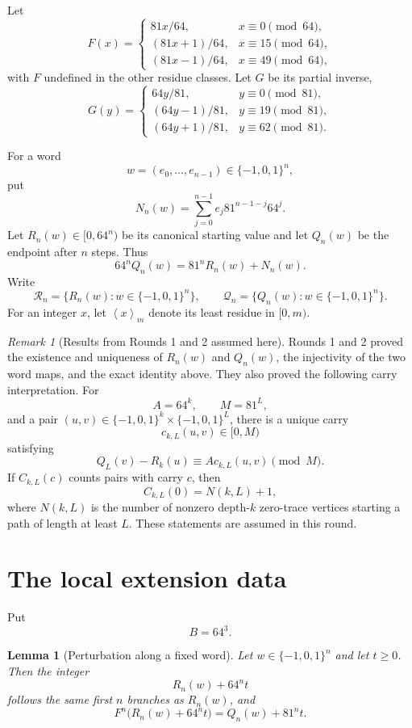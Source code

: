 \documentclass[11pt]{article}
\newtheorem{lemma}[theorem]{Lemma}
\theoremstyle{remark}
\newtheorem{remark}[theorem]{Remark}
\newcommand{\E}{\{-1,0,1\}}
\newcommand{\Rset}{\mathcal{R}}
\newcommand{\Qset}{\mathcal{Q}}
\newcommand{\res}[2]{\left\langle #1\right\rangle_{#2}}
\begin{document}
Let
\[
F(x)=
\begin{cases}
81x/64,&x\equiv0\pmod{64},\\
(81x+1)/64,&x\equiv15\pmod{64},\\
(81x-1)/64,&x\equiv49\pmod{64},
\end{cases}
\]
with $F$ undefined in the other residue classes.  Let $G$ be its partial inverse,
\[
G(y)=
\begin{cases}
64y/81,&y\equiv0\pmod{81},\\
(64y-1)/81,&y\equiv19\pmod{81},\\
(64y+1)/81,&y\equiv62\pmod{81}.
\end{cases}
\]

For a word
\[
w=(e_0,\ldots,e_{n-1})\in\E^n,
\]
put
\[
N_n(w)=\sum_{j=0}^{n-1}e_j81^{n-1-j}64^j.
\]
Let $R_n(w)\in[0,64^n)$ be its canonical starting value and let $Q_n(w)$ be the endpoint after $n$ steps.  Thus
\[
64^nQ_n(w)=81^nR_n(w)+N_n(w).
\]
Write
\[
\Rset_n=\{R_n(w):w\in\E^n\},
\qquad
\Qset_n=\{Q_n(w):w\in\E^n\}.
\]
For an integer $x$, let $\res{x}{m}$ denote its least residue in $[0,m)$.

\begin{remark}[Results from Rounds 1 and 2 assumed here]
Rounds 1 and 2 proved the existence and uniqueness of $R_n(w)$ and $Q_n(w)$, the injectivity of the two word maps, and the exact identity above.  They also proved the following carry interpretation.  For
\[
A=64^k,
\qquad
M=81^L,
\]
and a pair $(u,v)\in\E^k\times\E^L$, there is a unique carry
\[
c_{k,L}(u,v)\in[0,M)
\]
satisfying
\[
Q_L(v)-R_k(u)\equiv A c_{k,L}(u,v)\pmod M.
\]
If $C_{k,L}(c)$ counts pairs with carry $c$, then
\[
C_{k,L}(0)=N(k,L)+1,
\]
where $N(k,L)$ is the number of nonzero depth-$k$ zero-trace vertices starting a path of length at least $L$.  These statements are assumed in this round.
\end{remark}

\section{The local extension data}

Put
\[
B=64^3.
\]

\begin{lemma}[Perturbation along a fixed word]
\label{lem:perturb}
Let $w\in\E^n$ and let $t\ge0$.  Then the integer
\[
R_n(w)+64^nt
\]
follows the same first $n$ branches as $R_n(w)$, and
\[
F^n\bigl(R_n(w)+64^nt\bigr)=Q_n(w)+81^nt.
\]
\end{lemma}
\end{document}
